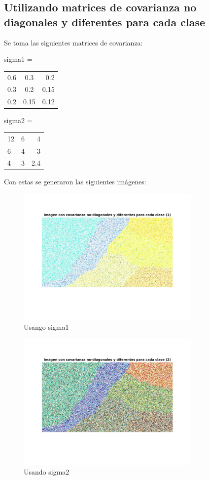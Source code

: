 \documentclass[a4paper,10pt]{article}
\begin{document}
\subsection{Utilizando matrices de covarianza no diagonales y diferentes para cada clase}

Se toma las siguientes matrices de covarianza:


sigma1 = 
\begin{tabular}{ l c r }
  0.6 & 0.3 & 0.2 \\
  0.3 & 0.2 & 0.15 \\
  0.2 & 0.15 & 0.12 \\
\end{tabular}


sigma2 =
\begin{tabular}{ l c r }
  12 & 6 & 4 \\
  6 & 4 & 3 \\
  4 & 3 & 2.4 \\
\end{tabular}

Con estas se generaron las siguientes im\'agenes:

\begin{figure}[H]
\centering
\includegraphics[width=90mm]{imagennDD1.jpg}
\caption{Usango sigma1}
\end{figure}


\begin{figure}[H]
\centering
\includegraphics[width=90mm]{imagennDD2.jpg}
\caption{Usando sigma2}
\end{figure}
\end{document}

